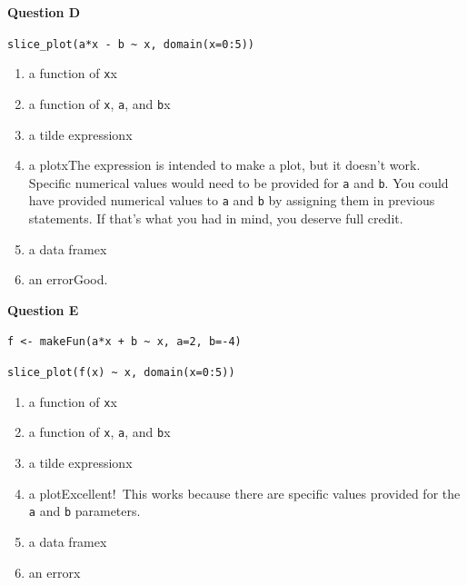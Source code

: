 \documentclass[
  letterpaper,
  DIV=11,
  numbers=noendperiod,
  oneside]{article}
\providecommand{\tightlist}{%
  \setlength{\itemsep}{0pt}\setlength{\parskip}{0pt}}\usepackage{longtable,booktabs,array}
\begin{document}
\begin{multicols}{2}
\textbf{Question D}

\texttt{slice\_plot(a*x\ -\ b\ \textasciitilde{}\ x,\ domain(x=0:5))}

\begin{enumerate}
\def\labelenumi{\roman{enumi}.}
\tightlist
\item
  {a function of \texttt{x}{x}}\\
\item
  {a function of \texttt{x}, \texttt{a}, and \texttt{b}{x}}\\
\item
  {a tilde expression{x}}\\
\item
  {a plot{xThe expression is intended to make a plot, but it doesn't
  work. Specific numerical values would need to be provided for
  \texttt{a} and \texttt{b}. You could have provided numerical values to
  \texttt{a} and \texttt{b} by assigning them in previous statements. If
  that's what you had in mind, you deserve full credit.}}\\
\item
  {a data frame{x}}\\
\item
  {an error{Good.~}}
\end{enumerate}

\textbf{Question E}

\texttt{f\ \textless{}-\ makeFun(a*x\ +\ b\ \textasciitilde{}\ x,\ a=2,\ b=-4)}

\texttt{slice\_plot(f(x)\ \textasciitilde{}\ x,\ domain(x=0:5))}

\begin{enumerate}
\def\labelenumi{\roman{enumi}.}
\tightlist
\item
  {a function of \texttt{x}{x}}\\
\item
  {a function of \texttt{x}, \texttt{a}, and \texttt{b}{x}}\\
\item
  {a tilde expression{x}}\\
\item
  {a plot{Excellent!~This works because there are specific values
  provided for the \texttt{a} and \texttt{b} parameters.}}\\
\item
  {a data frame{x}}\\
\item
  {an error{x}}
\end{enumerate}


\end{multicols}
\end{document}
